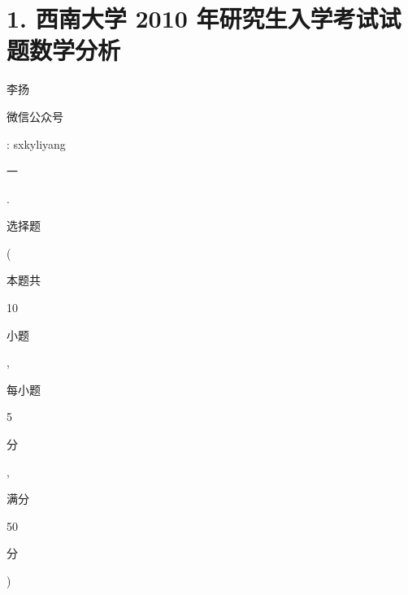 \documentclass[10pt]{article}
\begin{document}
\section{1. 西南大学 2010 年研究生入学考试试题数学分析}
\begin{CJK}{UTF8}{mj}李扬\end{CJK}

\begin{CJK}{UTF8}{mj}微信公众号\end{CJK}: sxkyliyang

\begin{CJK}{UTF8}{mj}一\end{CJK}. \begin{CJK}{UTF8}{mj}选择题\end{CJK} (\begin{CJK}{UTF8}{mj}本题共\end{CJK} 10 \begin{CJK}{UTF8}{mj}小题\end{CJK}, \begin{CJK}{UTF8}{mj}每小题\end{CJK} 5 \begin{CJK}{UTF8}{mj}分\end{CJK}, \begin{CJK}{UTF8}{mj}满分\end{CJK} 50 \begin{CJK}{UTF8}{mj}分\end{CJK})
\end{document}
